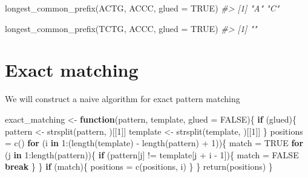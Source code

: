 \documentclass[
]{book}
\newenvironment{Shaded}{\begin{snugshade}}{\end{snugshade}}
\newcommand{\AttributeTok}[1]{\textcolor[rgb]{0.77,0.63,0.00}{#1}}
\newcommand{\CommentTok}[1]{\textcolor[rgb]{0.56,0.35,0.01}{\textit{#1}}}
\newcommand{\ConstantTok}[1]{\textcolor[rgb]{0.00,0.00,0.00}{#1}}
\newcommand{\ControlFlowTok}[1]{\textcolor[rgb]{0.13,0.29,0.53}{\textbf{#1}}}
\newcommand{\DecValTok}[1]{\textcolor[rgb]{0.00,0.00,0.81}{#1}}
\newcommand{\FunctionTok}[1]{\textcolor[rgb]{0.00,0.00,0.00}{#1}}
\newcommand{\NormalTok}[1]{#1}
\newcommand{\OtherTok}[1]{\textcolor[rgb]{0.56,0.35,0.01}{#1}}
\newcommand{\SpecialCharTok}[1]{\textcolor[rgb]{0.00,0.00,0.00}{#1}}
\newcommand{\StringTok}[1]{\textcolor[rgb]{0.31,0.60,0.02}{#1}}
\begin{document}
\begin{Shaded}
\begin{Highlighting}[]
\FunctionTok{longest\_common\_prefix}\NormalTok{(}\StringTok{\textquotesingle{}ACTG\textquotesingle{}}\NormalTok{, }\StringTok{\textquotesingle{}ACCC\textquotesingle{}}\NormalTok{, }\AttributeTok{glued =} \ConstantTok{TRUE}\NormalTok{)}
\CommentTok{\#\textgreater{} [1] "A" "C"}

\FunctionTok{longest\_common\_prefix}\NormalTok{(}\StringTok{\textquotesingle{}TCTG\textquotesingle{}}\NormalTok{, }\StringTok{\textquotesingle{}ACCC\textquotesingle{}}\NormalTok{, }\AttributeTok{glued =} \ConstantTok{TRUE}\NormalTok{)}
\CommentTok{\#\textgreater{} [1] ""}
\end{Highlighting}
\end{Shaded}

\hypertarget{exact-matching}{%
\section{Exact matching}\label{exact-matching}}

We will construct a naive algorithm for exact pattern matching

\begin{Shaded}
\begin{Highlighting}[]
\NormalTok{exact\_matching }\OtherTok{\textless{}{-}} \ControlFlowTok{function}\NormalTok{(pattern, template, }\AttributeTok{glued =} \ConstantTok{FALSE}\NormalTok{)\{}
  \ControlFlowTok{if}\NormalTok{ (glued)\{}
\NormalTok{    pattern }\OtherTok{\textless{}{-}} \FunctionTok{strsplit}\NormalTok{(pattern, }\StringTok{\textquotesingle{}\textquotesingle{}}\NormalTok{)[[}\DecValTok{1}\NormalTok{]]}
\NormalTok{    template }\OtherTok{\textless{}{-}} \FunctionTok{strsplit}\NormalTok{(template, }\StringTok{\textquotesingle{}\textquotesingle{}}\NormalTok{)[[}\DecValTok{1}\NormalTok{]]}
\NormalTok{  \}}
\NormalTok{  positions }\OtherTok{=} \FunctionTok{c}\NormalTok{()}
  \ControlFlowTok{for}\NormalTok{ (i }\ControlFlowTok{in} \DecValTok{1}\SpecialCharTok{:}\NormalTok{(}\FunctionTok{length}\NormalTok{(template) }\SpecialCharTok{{-}} \FunctionTok{length}\NormalTok{(pattern) }\SpecialCharTok{+} \DecValTok{1}\NormalTok{))\{}
\NormalTok{    match }\OtherTok{=} \ConstantTok{TRUE}
    \ControlFlowTok{for}\NormalTok{ (j }\ControlFlowTok{in} \DecValTok{1}\SpecialCharTok{:}\FunctionTok{length}\NormalTok{(pattern))\{}
      \ControlFlowTok{if}\NormalTok{ (pattern[j] }\SpecialCharTok{!=}\NormalTok{ template[j }\SpecialCharTok{+}\NormalTok{ i }\SpecialCharTok{{-}} \DecValTok{1}\NormalTok{])\{}
\NormalTok{        match }\OtherTok{=} \ConstantTok{FALSE}
        \ControlFlowTok{break}
\NormalTok{      \}}
\NormalTok{    \}}
    \ControlFlowTok{if}\NormalTok{ (match)\{}
\NormalTok{      positions }\OtherTok{=} \FunctionTok{c}\NormalTok{(positions, i)}
\NormalTok{    \}}
\NormalTok{  \}}
  \FunctionTok{return}\NormalTok{(positions)}
\NormalTok{\}}
\end{Highlighting}
\end{Shaded}
\end{document}
